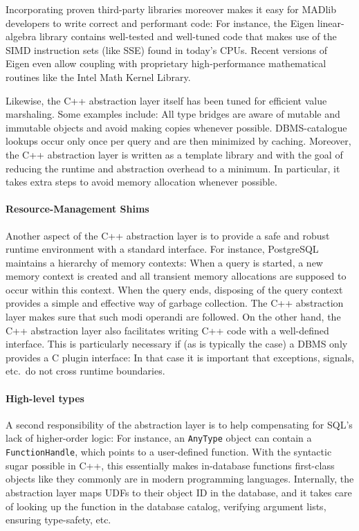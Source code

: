 Incorporating proven third-party libraries moreover makes it easy for MADlib developers to write correct and performant code: For instance, the Eigen linear-algebra library contains well-tested and well-tuned code that makes use of the SIMD instruction sets (like SSE) found in today's CPUs. Recent versions of Eigen even allow coupling with proprietary high-performance mathematical routines like the Intel Math Kernel Library.

Likewise, the C++ abstraction layer itself has been tuned for efficient value marshaling. Some examples include: All type bridges are aware of mutable and immutable objects and avoid making copies whenever possible. DBMS-catalogue lookups occur only once per query and are then minimized by caching. Moreover, the C++ abstraction layer is written as a template library and with the goal of reducing the runtime and abstraction overhead to a minimum. In particular, it takes extra steps to avoid memory allocation whenever possible.

\paragraph{Resource-Management Shims}

Another aspect of the C++ abstraction layer is to provide a safe and robust runtime environment with a standard interface. For instance, PostgreSQL maintains a hierarchy of memory contexts: When a query is started, a new memory context is created and all transient memory allocations are supposed to occur within this context. When the query ends, disposing of the query context provides a simple and effective way of garbage collection. The C++ abstraction layer makes sure that such modi operandi are followed. On the other hand, the C++ abstraction layer also facilitates writing C++ code with a well-defined interface. This is particularly necessary if (as is typically the case) a DBMS only provides a C plugin interface: In that case it is important that exceptions, signals, etc.\ do not cross runtime boundaries.

\paragraph{High-level types}

A second responsibility of the abstraction layer is to help compensating for SQL's lack of higher-order logic: For instance, an \texttt{AnyType} object can contain a \texttt{FunctionHandle}, which points to a user-defined function. With the syntactic sugar possible in C++, this essentially makes in-database functions first-class objects like they commonly are in modern programming languages. Internally, the abstraction layer maps UDFs to their object ID in the database, and it takes care of looking up the function in the database catalog, verifying argument lists, ensuring type-safety, etc.

